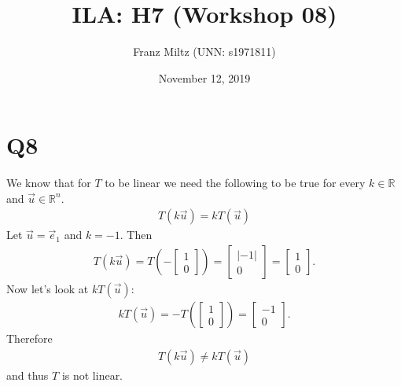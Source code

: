 \documentclass{article}
\title{ILA: H7 (Workshop 08)}
\author{Franz Miltz (UNN: s1971811)}
\date{November 12, 2019}
\begin{document}
\maketitle
\section*{Q8}
We know that for $T$ to be linear we need the following to be true for every $k\in\mathbb{R}$ and $\vec u \in\mathbb{R}^n$.
\begin{align*}
    T(k\vec u) = k T(\vec u)
\end{align*}
Let $\vec u = \vec e_1$ and $k = -1$. Then
\begin{align*}
    T(k\vec u) = T\left(-\begin{bmatrix}
        1 \\ 0
    \end{bmatrix}\right) =
    \begin{bmatrix}
        |-1| \\ 0
    \end{bmatrix} =
    \begin{bmatrix}
        1 \\0
    \end{bmatrix}.
\end{align*}
Now let's look at $kT(\vec u)$:
\begin{align*}
    kT(\vec u) = -T\left(\begin{bmatrix}
        1 \\ 0
    \end{bmatrix}\right)
    = \begin{bmatrix}
        -1 \\ 0
    \end{bmatrix}.
\end{align*}
Therefore
\begin{align*}
    T(k\vec u) \not= kT(\vec u)
\end{align*}
and thus $T$ is not linear.
\end{document}
